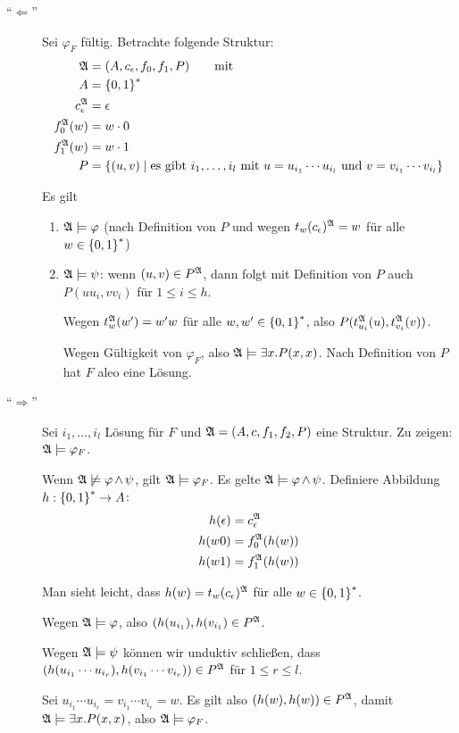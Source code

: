 \begin{description}
  \item[\enquote{$\Leftarrow$}]
  Sei $\varphi_F$ fültig. Betrachte folgende Struktur:
  \begin{align*}
    \mathfrak{A} &= (A, c_\epsilon, f_0, f_1, P) \qquad\text{mit} \\
    A &= \left\{0,1\right\}^*\\
    c_\epsilon^{\mathfrak{A}} &= \epsilon\\
    f_0^{\mathfrak{A}}(w) &= w \cdot 0\\
    f_1^{\mathfrak{A}}(w) &= w \cdot 1\\
    P &= \left\{(u,v) \mid \text{es gibt $i_1,\dots,i_l$ mit $u=u_{i_1}\cdots u_{i_l}$ und $v=v_{i_1}\cdots v_{i_l}$}\right\}
  \end{align*}
  
  Es gilt
  \begin{enumerate}
    \item $\mathfrak{A} \models \varphi$ (nach Definition von $P$ und wegen $t_w(c_\epsilon)^{\mathfrak{A}}=w$ für alle $w\in\left\{0,1\right\}^*$)
    \item $\mathfrak{A} \models \psi$: wenn $(u,v)\in P^{\mathfrak{A}}$, dann folgt mit Definition von $P$ auch $P(uu_i, vv_i)$ für $1\leq i\leq h$.
    
    Wegen $t_w^{\mathfrak{A}}(w') = w'w$ für alle $w,w'\in\left\{0,1\right\}^*$, also $P(t_{u_i}^{\mathfrak{A}}(u), t_{v_i}^{\mathfrak{A}}(v))$.

    Wegen Gültigkeit von $\varphi_F$, also $\mathfrak{A} \models \exists x.P(x,x)$. Nach Definition von $P$ hat $F$ aleo eine Lösung.
  \end{enumerate}
  
  \item[\enquote{$\Rightarrow$}]
  Sei $i_1,\dots,i_l$ Lösung für $F$ und $\mathfrak{A} = (A, c, f_1, f_2, P)$ eine Struktur. Zu zeigen: $\mathfrak{A}\models\varphi_F$.
  
  Wenn $\mathfrak{A}\not\models \varphi\operatorname{\wedge}\psi$, gilt $\mathfrak{A}\models\varphi_F$. Es gelte $\mathfrak{A}\models\varphi\operatorname{\wedge}\psi$.
  Definiere Abbildung $h : \left\{0,1\right\}^* \rightarrow A$:
  \begin{align*}
    h(\epsilon) &= c_\epsilon^{\mathfrak{A}}\\
    h(w0) &= f_0^{\mathfrak{A}}(h(w))\\
    h(w1) &= f_1^{\mathfrak{A}}(h(w))
  \end{align*}
  
  Man sieht leicht, dass $h(w)=t_w(c_\epsilon)^{\mathfrak{A}}$ für alle $w\in\left\{0,1\right\}^*$.
  
  Wegen $\mathfrak{A} \models \varphi$, also $(h(u_{i_1}), h(v_{i_1}) \in P^{\mathfrak{A}}$.
  
  Wegen $\mathfrak{A} \models \psi$ können wir unduktiv schließen, dass $(h(u_{i_1}\cdots u_{i_r}), h(v_{i_1}\cdots v_{i_r}))\in P^{\mathfrak{A}}$ für $1\leq r\leq l$.
  
  Sei $u_{i_1}\cdots u_{i_r} = v_{i_1}\cdots v_{i_r} = w$. Es gilt also $(h(w),h(w)) \in P^{\mathfrak{A}}$, damit $\mathfrak{A} \models \exists x.P(x,x)$, also $\mathfrak{A}\models\varphi_F$.
\end{description}

